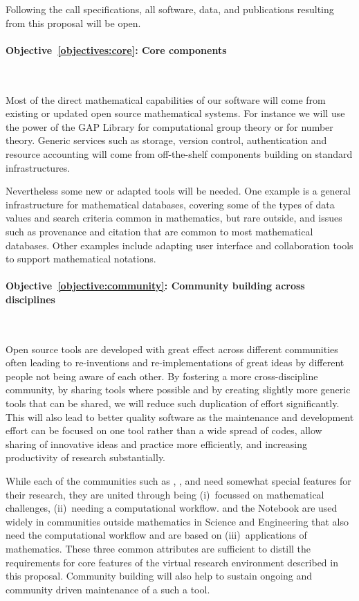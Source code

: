 \documentclass[noworkareas,deliverables,keys]{euproposal}                  %
\begin{document}
\begin{proposal}
Following the call specifications, all software, data, and
publications resulting from this proposal will be open.



\paragraph{Objective~\ref{objectives:core}: Core components}\

Most of the direct mathematical capabilities of our software will come
from existing or updated open source mathematical systems. For instance we will
use the power of the GAP Library for computational group theory or
\PariGP for number theory. Generic services such as storage, version
control, authentication and resource accounting will come from
off-the-shelf components building on standard infrastructures. 

Nevertheless some new or adapted tools will be needed. One example is
a general infrastructure for mathematical databases, covering some of
the types of data values and search criteria common in mathematics,
but rare outside, and issues such as provenance and citation that are
common to most mathematical databases. Other examples include adapting
user interface and collaboration tools to support mathematical notations.




\paragraph{Objective~\ref{objective:community}: Community building across disciplines}\ 


Open source tools are developed with great effect across different
communities often leading to re-inventions and re-implementations of
great ideas by different people not being aware of each other. By
fostering a more cross-discipline community, by sharing tools where
possible and by creating slightly more generic tools that can be shared,
we will reduce such duplication of effort significantly. This will
also lead to better quality software as the maintenance and
development effort can be focused on one tool rather than a wide
spread of codes, allow sharing of innovative ideas and practice more
efficiently, and increasing productivity of research substantially.

While each of the communities such as \Sage, \Singular, and \GAP need
somewhat special features for their research, they are united through
being (i)~focussed on mathematical challenges, (ii)~needing a
computational workflow. \IPython and the \Jupyter Notebook are used
widely in communities outside mathematics in Science and Engineering
that also need the computational workflow and are based on
(iii)~applications of mathematics. These three common attributes are
sufficient to distill the requirements for core features of the
virtual research environment described in this \TheProject{}
proposal. Community building will also help to sustain ongoing and
community driven maintenance of a such a tool.




\end{proposal}
\end{document}
